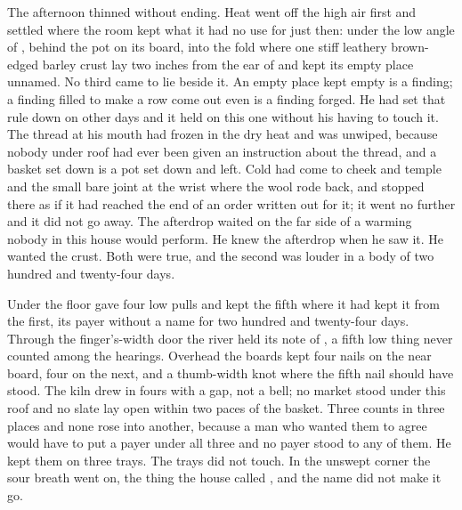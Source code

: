 The afternoon thinned without ending. Heat went off the high air first and settled where the room kept what it had no use for just then: under the low angle of , behind the pot on its board, into the fold where one stiff leathery brown-edged barley crust lay two inches from the ear of  and kept its empty place unnamed. No third came to lie beside it. An empty place kept empty is a finding; a finding filled to make a row come out even is a finding forged. He had set that rule down on other days and it held on this one without his having to touch it. The thread at his mouth had frozen in the dry heat and was unwiped, because nobody under  roof had ever been given an instruction about the thread, and a basket set down is a pot set down and left. Cold had come to cheek and temple and the small bare joint at the wrist where the wool rode back, and stopped there as if it had reached the end of an order written out for it; it went no further and it did not go away. The afterdrop waited on the far side of a warming nobody in this house would perform. He knew the afterdrop when he saw it. He wanted the crust. Both were true, and the second was louder in a body of two hundred and twenty-four days.

Under the floor  gave four low pulls and kept the fifth where it had kept it from the first, its payer without a name for two hundred and twenty-four days. Through the finger's-width door the river held its note of , a fifth low thing never counted among the hearings. Overhead the boards kept four nails on the near board, four on the next, and a thumb-width knot where the fifth nail should have stood. The kiln drew in fours with a gap, not a bell; no market stood under this roof and no slate lay open within two paces of the basket. Three counts in three places and none rose into another, because a man who wanted them to agree would have to put a payer under all three and no payer stood to any of them. He kept them on three trays. The trays did not touch. In the unswept corner the sour  breath went on, the thing the house called , and the name did not make it go.

